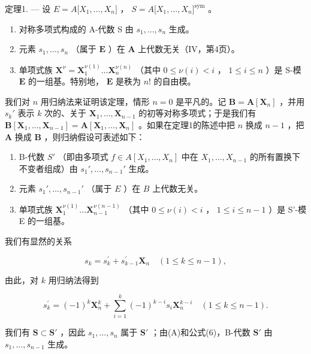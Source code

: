定理1. --- 设 \(E = A{[}X_{1}, \ldots, X_{n}{]}\) ， \(S = A{[}X_{1}, \ldots, X_{n}{]}^{\text{sym}}\) 。

\begin{enumerate}
\def\labelenumi{\alph{enumi})}
\item
  对称多项式构成的 A-代数 S 由 \(s_1, \ldots, s_n\) 生成。
\item
  元素 \(s_1, \ldots, s_n\) （属于 \(\mathbf{E}\) ）在 \(\mathbf{A}\) 上代数无关（IV，第4页）。
\item
  单项式族 \(\mathbf{X}^{\nu} = \mathbf{X}_1^{\nu(1)} \ldots \mathbf{X}_n^{\nu(n)}\) （其中 \(0 \leqslant \nu(i) < i\) ， \(1 \leqslant i \leqslant n\) ）是 S-模 \(\mathbf{E}\) 的一组基。特别地， \(\mathbf{E}\) 是秩为 \(n!\) 的自由模。
\end{enumerate}

我们对 \(n\) 用归纳法来证明该定理，情形 \(n = 0\) 是平凡的。记 \(\mathbf{B} = \mathbf{A}[\mathbf{X}_n]\) ，并用 \(s_k'\) 表示 \(k\) 次的、关于 \(\mathbf{X}_1, \ldots, \mathbf{X}_{n-1}\) 的初等对称多项式；于是我们有 \(\mathbf{B}[\mathbf{X}_1, \ldots, \mathbf{X}_{n-1}] = \mathbf{A}[\mathbf{X}_1, \ldots, \mathbf{X}_n]\) 。如果在定理1的陈述中把 \(n\) 换成 \(n-1\) ，把 \(\mathbf{A}\) 换成 \(\mathbf{B}\) ，则归纳假设可表述如下：

\begin{enumerate}
\def\labelenumi{(\Alph{enumi})}
\item
  B-代数 \(S'\) （即由多项式 \(f \in A[X_1, \ldots, X_n]\) 中在 \(X_1, \ldots, X_{n-1}\) 的所有置换下不变者组成）由 \(s_1', \ldots, s_{n-1}'\) 生成。
\item
  元素 \(s_1', \ldots, s_{n-1}'\) （属于 \(E\) ）在 \(B\) 上代数无关。
\item
  单项式族 \(\mathbf{X}_{1}^{\nu(1)}\ldots\mathbf{X}_{n-1}^{\nu(n-1)}\) （其中 \(0\leqslant\nu(i)<i\) ， \(1\leqslant i\leqslant n-1\) ）是 S'-模 E 的一组基。
\end{enumerate}

我们有显然的关系

\[
s _ {k} = s _ {k} ^ {\prime} + s _ {k - 1} ^ {\prime} \mathbf {X} _ {n} \quad (1 \leqslant k \leqslant n - 1),\tag{5}
\]

由此，对 \(k\) 用归纳法得到

\[
s _ {k} ^ {\prime} = (- 1) ^ {k} \mathbf {X} _ {n} ^ {k} + \sum_ {i = 1} ^ {k} (- 1) ^ {k - i} s _ {i} \mathbf {X} _ {n} ^ {k - i} \quad (1 \leqslant k \leqslant n - 1).\tag{6}
\]

我们有 \(\mathbf{S} \subset \mathbf{S}'\) ，因此 \(s_1, \ldots, s_n\) 属于 \(\mathbf{S}'\) ；由(A)和公式(6)，B-代数 \(\mathbf{S}'\) 由 \(s_1, \ldots, s_{n-1}\) 生成。

